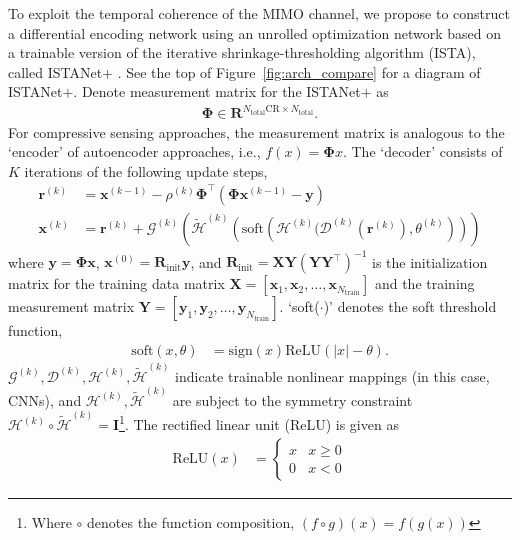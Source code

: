 To exploit the temporal coherence of the MIMO channel, we propose to construct a differential encoding network using an unrolled optimization network based on a trainable version of the iterative shrinkage-thresholding algorithm (ISTA), called ISTANet+ \cite{ref:zhang2018ista}. See the top of Figure~\ref{fig:arch_compare} for a diagram of ISTANet+. Denote measurement matrix for the ISTANet+ as 
\begin{align}
    \mathbf \Phi \in \mathbf{R}^{N_{\text{total}}\text{CR} \times N_{\text{total}}}.
\end{align}
For compressive sensing approaches, the measurement matrix is analogous to the `encoder' of autoencoder approaches, i.e., $f(x)=\mathbf\Phi x$. The `decoder' consists of $K$ iterations of the following update steps,
\begin{align}
    \mathbf{r}^{(k)} &= \mathbf{x}^{(k-1)}-\rho^{(k)}\mathbf{\Phi}^\top(\mathbf{\Phi}\mathbf x^{(k-1)}-\mathbf y) \label{eq:istanet-grad} \\
    \mathbf x^{(k)} &= \mathbf{r}^{(k)} + \mathcal{G}^{(k)}\left(\tilde{\mathcal{H}}^{(k)}\left(\text{soft}\left(\mathcal{H}^{(k)}(\mathcal{D}^{(k)}(\mathbf{r}^{(k)}), \theta^{(k)}\right)\right)\right) \label{eq:istanet-prox}
\end{align}
where $\mathbf y=\mathbf{\Phi} \mathbf x$, $\mathbf x^{(0)}=\mathbf{R}_{\text{init}}\mathbf{y}$, and $\mathbf R_{\text{init}}=\mathbf {XY}(\mathbf{YY}^\top)^{-1}$ is the initialization matrix for the training data matrix $\mathbf X = \left[\mathbf{x}_1, \mathbf{x}_2,\dots, \mathbf{x}_{N_{\text{train}}}\right]$ and the training measurement matrix $\mathbf Y = \left[\mathbf{y}_1, \mathbf{y}_2,\dots, \mathbf{y}_{N_{\text{train}}}\right]$. `soft($\cdot$)' denotes the soft threshold function,
\begin{align}
    \text{soft}(x, \theta) &= \text{sign}(x)\text{ReLU}(|x|-\theta). \label{eq:soft}
\end{align}
$\mathcal G^{(k)}, \mathcal D^{(k)},  \mathcal H^{(k)}, \tilde{\mathcal H}^{(k)}$ indicate trainable nonlinear mappings (in this case, CNNs), and $\mathcal H^{(k)}, \tilde{\mathcal H}^{(k)}$ are subject to the symmetry constraint $\mathcal H^{(k)}\circ \tilde{\mathcal H}^{(k)}=\mathbf I$\footnote{Where $\circ$ denotes the function composition, $(f \circ g)(x) = f(g(x))$}. The rectified linear unit (ReLU) is given as
\begin{align*}
    \text{ReLU}(x) &= 
        \begin{cases}
            x & x \geq 0 \\
            0 & x < 0
        \end{cases}
\end{align*}
